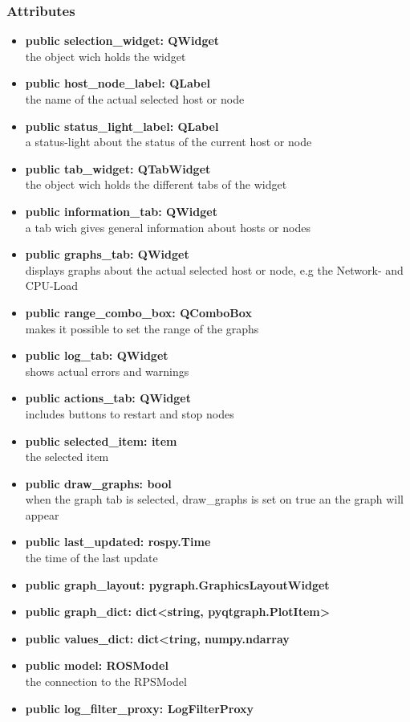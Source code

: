 \subsubsection{Attributes}
\begin{itemize}
  \item \textbf{public selection\_widget: QWidget}\\
  the object wich holds the widget
  \item \textbf{public host\_node\_label: QLabel}\\
  the name of the actual selected host or node
  \item \textbf{public status\_light\_label: QLabel}\\
  a status-light about the status of the current host or node
  \item \textbf{public tab\_widget: QTabWidget}\\
  the object wich holds the different tabs of the widget
  \item \textbf{public information\_tab: QWidget}\\
  a tab wich gives general information about hosts or nodes 
  \item \textbf{public graphs\_tab: QWidget}\\
  displays graphs about the actual selected host or node, e.g the Network- and
  CPU-Load
  \item \textbf{public range\_combo\_box: QComboBox}\\
  makes it possible to set the range of the graphs
  \item \textbf{public log\_tab: QWidget}\\
  shows actual errors and warnings
  \item \textbf{public actions\_tab: QWidget}\\
  includes buttons to restart and stop nodes
  \item \textbf{public selected\_item: item}\\
  the selected item
  \item \textbf{public draw\_graphs: bool}\\
  when the graph tab is selected, draw\_graphs is set on true an the graph will
  appear
  \item \textbf{public last\_updated: rospy.Time}\\
  the time of the last update
  \item \textbf{public graph\_layout: pygraph.GraphicsLayoutWidget}\\
  
  \item \textbf{public graph\_dict: dict<string, pyqtgraph.PlotItem>}\\
  
  \item \textbf{public values\_dict: dict<tring, numpy.ndarray}\\
  
  \item \textbf{public model: ROSModel}\\
  the connection to the RPSModel
  \item \textbf{public log\_filter\_proxy: LogFilterProxy}\\
  
\end{itemize}
